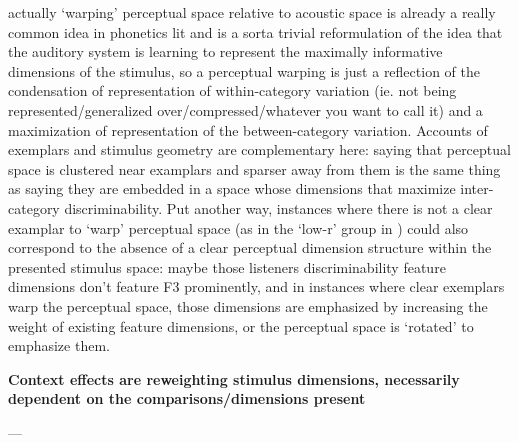 \begin{multicols}{2}
actually `warping' perceptual space relative to acoustic space is already a really common idea in phonetics lit\cite{iversonInfluencesPhoneticIdentification1996} and is a sorta trivial reformulation of the idea that the auditory system is learning to represent the maximally informative dimensions of the stimulus, so a perceptual warping is just a reflection of the condensation of representation of within-category variation (ie. not being represented/generalized over/compressed/whatever you want to call it) and a maximization of representation of the between-category variation. Accounts of exemplars and stimulus geometry are complementary here: saying that perceptual space is clustered near examplars and sparser away from them is the same thing as saying they are embedded in a space whose dimensions that maximize inter-category discriminability. Put another way, instances where there is not a clear examplar to `warp' perceptual space (as in the `low-r' group in \cite{iversonInfluencesPhoneticIdentification1996}) could also correspond to the absence of a clear perceptual dimension structure within the presented stimulus space: maybe those listeners discriminability feature dimensions don't feature F3 prominently, and in instances where clear exemplars warp the perceptual space, those dimensions are emphasized by increasing the weight of existing feature dimensions, or the perceptual space is `rotated' to emphasize them. 

\textbf{Context effects are reweighting stimulus dimensions, necessarily dependent on the comparisons/dimensions present}

---



\end{multicols}
